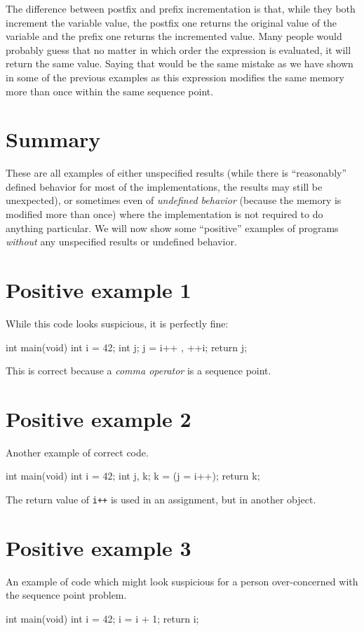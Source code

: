The difference between postfix and prefix incrementation is that, while they both increment the variable value, the postfix one returns the original value of the variable and the prefix one returns the incremented value. Many people would probably guess that no matter in which order the expression is evaluated, it will return the same value. Saying that would be the same mistake as we have shown in some of the previous examples as this expression modifies the same memory more than once within the same sequence point.

\section{Summary}
These are all examples of either unspecified results (while there is ``reasonably'' defined behavior for most of the implementations, the results may still be unexpected), or sometimes even of \emph{undefined behavior} (because the memory is modified more than once) where the implementation is not required to do anything particular. We will now show some ``positive'' examples of programs \emph{without} any unspecified results or undefined behavior.

\section{Positive example 1}
While this code looks suspicious, it is perfectly fine:
\\\begin{code}
int main(void){
    int i = 42;
    int j;
    j = i++ , ++i;
    return j;
}
\end{code}

This is correct because a \emph{comma operator} is a sequence point.

\section{Positive example 2}
Another example of correct code.
\\\begin{code}
int main(void){
    int i = 42;
    int j, k;
    k = (j = i++);
    return k;
}
\end{code}

The return value of \verb|i++| is used in an assignment, but in another object.

\section{Positive example 3}
An example of code which might look suspicious for a person over-concerned with the sequence point problem.
\\\begin{code}
int main(void){
    int i = 42;
    i = i + 1;
    return i;
}
\end{code}

